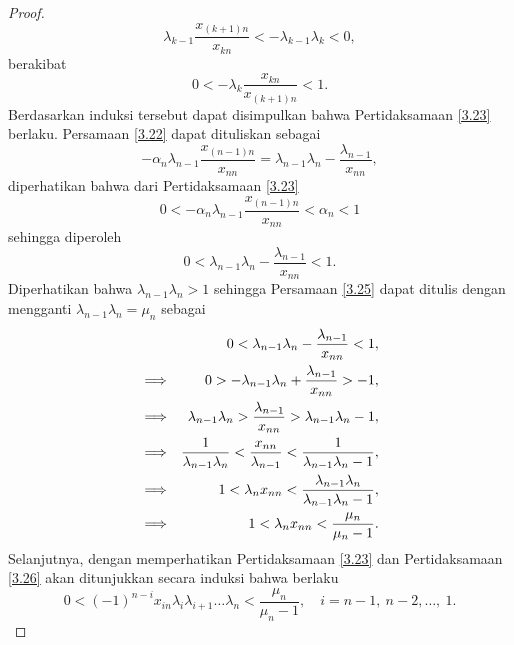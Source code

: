 \begin{proof}
\begin{equation*}
        \lambda_{k-1}\frac{x_{(k+1)n}}{x_{kn}} < -\lambda_{k-1}\lambda_{k} < 0,
    \end{equation*}
    berakibat
    \begin{equation*}
        0 < -\lambda_{k}\frac{x_{kn}}{x_{(k+1)n}} < 1.
    \end{equation*}
    Berdasarkan induksi tersebut dapat disimpulkan bahwa Pertidaksamaan \eqref{3.23} berlaku. Persamaan \eqref{3.22} dapat dituliskan sebagai
    \begin{equation*}
        -\alpha_n \lambda_{n-1} \frac{x_{(n-1)n}}{x_{nn}} = \lambda_{n-1}\lambda_{n} - \frac{\lambda_{n-1}}{x_{nn}},
    \end{equation*}
    diperhatikan bahwa dari Pertidaksamaan \eqref{3.23}
    \begin{equation*}
        0 <  -\alpha_n \lambda_{n-1} \frac{x_{(n-1)n}}{x_{nn}} < \alpha_n < 1
    \end{equation*}
    sehingga diperoleh
    \begin{equation}\label{3.25}
        0 <  \lambda_{n-1}\lambda_{n} - \frac{\lambda_{n-1}}{x_{nn}} < 1.
    \end{equation}
    Diperhatikan bahwa $\lambda_{n-1}\lambda_{n} > 1$ sehingga Persamaan \eqref{3.25} dapat ditulis dengan mengganti $\lambda_{n-1}\lambda_{n}=\mu_n$ sebagai
    \begin{align}
        &&0 <  \lambda_{n-1}\lambda_{n} - \frac{\lambda_{n-1}}{x_{nn}} < 1, \notag \\
        &\Longrightarrow&0 >  -\lambda_{n-1}\lambda_{n} + \frac{\lambda_{n-1}}{x_{nn}} > -1,\notag \\
        &\Longrightarrow&\lambda_{n-1}\lambda_{n} > \frac{\lambda_{n-1}}{x_{nn}} > \lambda_{n-1}\lambda_{n} - 1,\notag \\
        &\Longrightarrow& \frac{1}{\lambda_{n-1}\lambda_{n}} < \frac{x_{nn}}{\lambda_{n-1}} < \frac{1}{\lambda_{n-1}\lambda_{n} - 1},\notag \\
        &\Longrightarrow&1 < \lambda_{n}x_{nn} < \frac{\lambda_{n-1}\lambda_{n}}{\lambda_{n-1}\lambda_{n} - 1}, \notag \\
        &\Longrightarrow& 1 < \lambda_{n}x_{nn} <  \frac{\mu_n}{\mu_n - 1}. \label{3.26}
    \end{align}
    Selanjutnya, dengan memperhatikan Pertidaksamaan \eqref{3.23} dan Pertidaksamaan \eqref{3.26} akan ditunjukkan secara induksi bahwa berlaku
    \begin{equation}\label{3.27}
        0 < (-1)^{n-i}x_{in}\lambda_i\lambda_{i+1}\dots\lambda_n < \frac{\mu_n}{\mu_n - 1}, \quad i=n-1,~n-2,\dots,~1.

\end{equation}
\end{proof}

